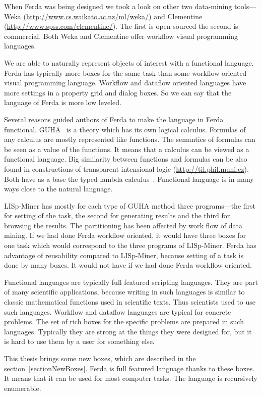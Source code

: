 \documentclass[a4paper,12pt]{book}
\begin{document}
When Ferda was being designed we took a look on other two data-mining tools---Weka (\url{http://www.cs.waikato.ac.nz/ml/weka/}) and Clementine (\url{http://www.spss.com/clementine/}). The first is open sourced the second is commercial. Both Weka and Clementine offer workflow visual programming languages.

We are able to naturally represent objects of interest with a functional language. Ferda has typically more boxes for the same task than some workflow oriented visual programming language. Workflow and dataflow oriented languages have more settings in a property grid and dialog boxes. So we can say that the language of Ferda is more low leveled.

Several reasons guided authors of Ferda to make the language in Ferda functional. GUHA~\cite{GUHAbook} is a theory which has its own logical calculus. Formulas of any calculus are mostly represented like functions. The semantics of formulas can be seen as a value of the functions. It means that a calculus can be viewed as a functional language. Big similarity between functions and formulas can be also found in constructions of transparent intensional logic (\url{http://til.phil.muni.cz}). Both have as a base the typed lambda calculus~\cite{lambdaCalculus}. Functional language is in many ways close to the natural language. 

LISp-Miner has mostly for each type of GUHA method three programs---the first for setting of the task, the second for generating results and the third for browsing the results. The partitioning has been affected by work flow of data mining. If we had done Ferda workflow oriented, it would have three boxes for one task which would correspond to the three programs of LISp-Miner. Ferda has advantage of reusability compared to LISp-Miner, because setting of a task is done by many boxes. It would not have if we had done Ferda workflow oriented. 

Functional languages are typically full featured scripting languages. They are part of many scientific applications, because writing in such languages is similar to classic mathematical functions used in scientific texts. Thus scientists used to use such languages. Workflow and dataflow languages are typical for concrete problems. The set of rich boxes for the specific problems are prepared in such languages. Typically they are strong at the things they were designed for, but it is hard to use them by a user for something else.

This thesis brings some new boxes, which are described in the section~\ref{sectionNewBoxes}. Ferda is full featured language thanks to these boxes. It means that it can be used for most computer tasks. The language is recursively enumerable.
\end{document}
